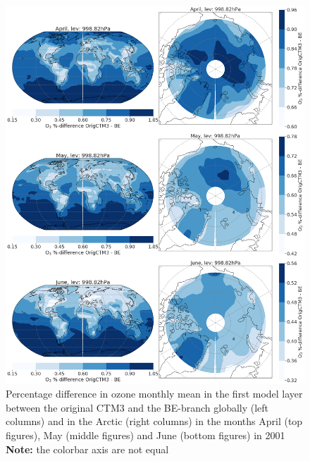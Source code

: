 \begin{figure}[h]
    \centering
    \includegraphics[width = \linewidth]{Chapter6_Results/images/Orig_BE_comp/BE_origPD_percent_lev0_AprJune_2001.png}
    \caption{Percentage difference in ozone monthly mean in the first model layer between the original CTM3 and the BE-branch globally (left columns) and in the Arctic (right columns) in the months April (top figures), May (middle figures) and June (bottom figures) in 2001 \textbf{Note:} the colorbar axis are not equal}
    \label{fig:BE_origPD_percent_AprJun}
\end{figure}

